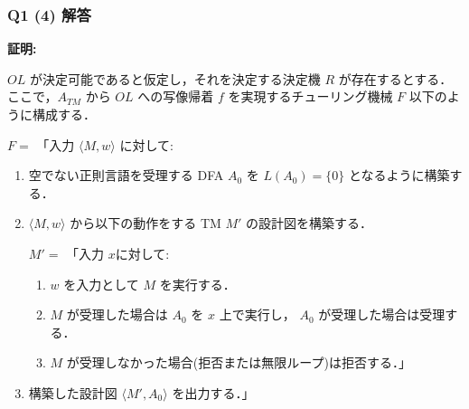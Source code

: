\begin{frame}[fragile]
\frametitle{Q1 (4) 解答}

\textbf{証明:}

$OL$ が決定可能であると仮定し，それを決定する決定機 $R$ が存在するとする．ここで，$A_{TM}$ から $OL$ への写像帰着 $f$ を実現するチューリング機械 $F$ 以下のように構成する．

$F =$ 「入力 $\langle M, w \rangle$ に対して:

\begin{enumerate}
    \item 空でない正則言語を受理する DFA $A_0$ を $L(A_0) = \{0\}$ となるように構築する．
    \item $\langle M, w \rangle$ から以下の動作をする TM $M'$ の設計図を構築する．

     $M' =$ 「入力 $x$に対して:

    \begin{enumerate}
        \item[1.] $w$ を入力として $M$ を実行する．
        \item[2.] $M$ が受理した場合は $A_0$ を $x$ 上で実行し， $A_0$ が受理した場合は受理する．
        \item[3.] $M$ が受理しなかった場合(拒否または無限ループ)は拒否する．」
    \end{enumerate}

    \item 構築した設計図 $\langle M', A_0 \rangle$ を出力する．」

\end{enumerate}

\end{frame}



